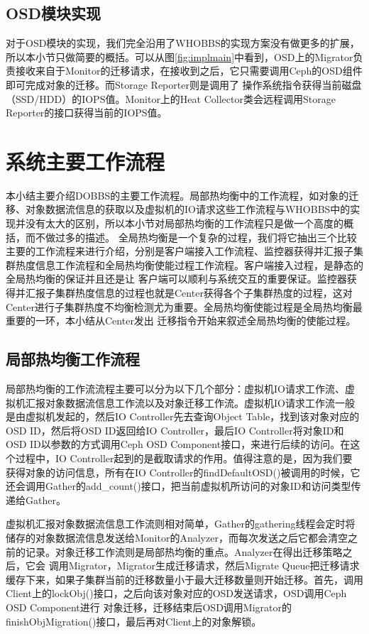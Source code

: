 \subsection{OSD模块实现}
对于OSD模块的实现，我们完全沿用了WHOBBS的实现方案没有做更多的扩展，所以本小节只做简要的概括。可以从图\ref{fig:implmain}中看到，OSD上的Migrator负责接收来自于Monitor的迁移请求，在接收到之后，它只需要调用Ceph的OSD组件即可完成对象的迁移。而Storage Reporter则是调用了
操作系统指令获得当前磁盘（SSD/HDD）的IOPS值。Monitor上的Heat Collector类会远程调用Storage Reporter的接口获得当前的IOPS值。

\section{系统主要工作流程}
本小结主要介绍DOBBS的主要工作流程。局部热均衡中的工作流程，如对象的迁移、对象数据流信息的获取以及虚拟机的IO请求这些工作流程与WHOBBS中的实现并没有太大的区别，所以本小节对局部热均衡的工作流程只是做一个高度的概括，而不做过多的描述。
全局热均衡是一个复杂的过程，我们将它抽出三个比较主要的工作流程来进行介绍，分别是客户端接入工作流程、监控器获得并汇报子集群热度信息工作流程和全局热均衡使能过程工作流程。客户端接入过程，是静态的全局热均衡的保证并且还是让
客户端可以顺利与系统交互的重要保证。监控器获得并汇报子集群热度信息的过程也就是Center获得各个子集群热度的过程，这对Center进行子集群热度不均衡检测尤为重要。全局热均衡使能过程是全局热均衡最重要的一环，本小结从Center发出
迁移指令开始来叙述全局热均衡的使能过程。

\subsection{局部热均衡工作流程}

局部热均衡的工作流流程主要可以分为以下几个部分：虚拟机IO请求工作流、虚拟机汇报对象数据流信息工作流以及对象迁移工作流。虚拟机IO请求工作流一般是由虚拟机发起的，然后IO Controller先去查询Object Table，找到该对象对应的
OSD ID，然后将OSD ID返回给IO Controller，最后IO Controller将对象ID和OSD ID以参数的方式调用Ceph OSD Component接口，来进行后续的访问。在这个过程中，IO Controller起到的是截取请求的作用。值得注意的是，因为我们要
获得对象的访问信息，所有在IO Controller的findDefaultOSD()被调用的时候，它还会调用Gather的add\_count()接口，把当前虚拟机所访问的对象ID和访问类型传递给Gather。


虚拟机汇报对象数据流信息工作流则相对简单，Gather的gathering线程会定时将储存的对象数据流信息发送给Monitor的Analyzer，而每次发送之后它都会清空之前的记录。对象迁移工作流则是局部热均衡的重点。Analyzer在得出迁移策略之后，它会
调用Migrator，Migrator生成迁移请求，然后Migrate Queue把迁移请求缓存下来，如果子集群当前的迁移数量小于最大迁移数量则开始迁移。首先，调用Client上的lockObj()接口，之后向该对象对应的OSD发送请求，OSD调用Ceph OSD Component进行
对象迁移，迁移结束后OSD调用Migrator的finishObjMigration()接口，最后再对Client上的对象解锁。

